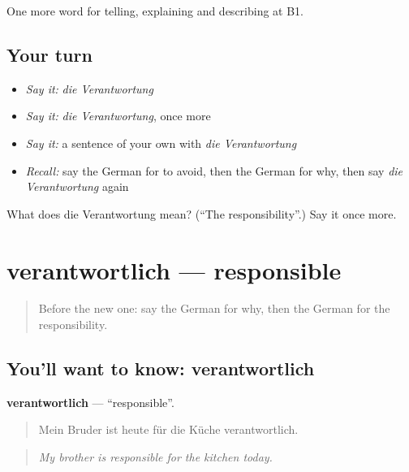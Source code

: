 \begin{grammarlens}[title={What you've built}]
One more word for telling, explaining and describing at B1.
\end{grammarlens}

\subsection*{Your turn}
\begin{itemize}
\raggedright
  \item \emph{Say it:} \emph{die Verantwortung}
  \item \emph{Say it:} \emph{die Verantwortung}, once more
  \item \emph{Say it:} a sentence of your own with \emph{die Verantwortung}
  \item \emph{Recall:} say the German for to avoid, then the German for why, then say \emph{die Verantwortung} again
\end{itemize}

\begin{tcolorbox}[breakable,colback=teal!4,colframe=teal!35!black,title={Before you move on}]
What does die Verantwortung mean? (\textquotedblleft{}The responsibility\textquotedblright{}.) Say it once more.
\end{tcolorbox}
\section[verantwortlich]{verantwortlich — responsible}

\label{lesson:GE-C348-verantwortlich}



\begin{quote}
Before the new one: say the German for why, then the German for the responsibility.
\end{quote}

\subsection*{You'll want to know: verantwortlich}
\textbf{verantwortlich} — \textquotedblleft{}responsible\textquotedblright{}.

\begin{quote}
Mein Bruder ist heute für die Küche verantwortlich.
\end{quote}

\begin{quote}
\emph{My brother is responsible for the kitchen today.}
\end{quote}


